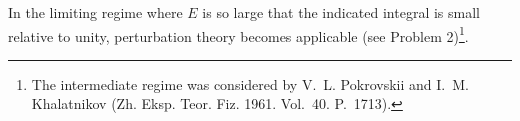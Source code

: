 In the limiting regime where $E$ is so large that the indicated integral is
small relative to unity, perturbation theory becomes applicable (see Problem
2)\footnote{The intermediate regime was considered by V.~L. Pokrovskii and
I.~M. Khalatnikov (Zh. Eksp. Teor. Fiz. 1961. Vol.~40. P.~1713).}.
